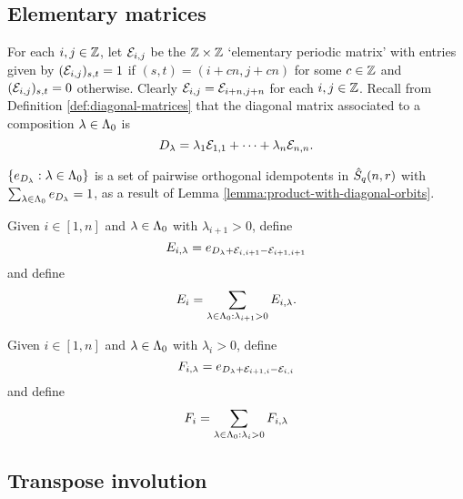 \documentclass[a4paper, 11pt]{report}
\begin{document}
\subsection{Elementary matrices}

For each $i,j\in\mathbb{Z}$, let $\mathcal{E}_{i,j}$ be the $\mathbb{Z}\times\mathbb{Z}$ `elementary periodic matrix' with entries given by $(\mathcal{E}_{i,j})_{s,t}=1$ if $(s,t) = (i+cn,j+cn)$ for some $c\in\mathbb{Z}$ and $(\mathcal{E}_{i,j})_{s,t}=0$ otherwise. Clearly $\mathcal{E}_{i,j} = \mathcal{E}_{i+n,j+n}$ for each $i,j\in\mathbb{Z}$. Recall from Definition \ref{def:diagonal-matrices} that the diagonal matrix associated to a composition $\lambda\in{\Lambda_0}$ is
\begin{equation*}
D_\lambda = \lambda_1\mathcal{E}_{1,1} +\cdots + \lambda_n\mathcal{E}_{n,n}.
\end{equation*}

$\{e_{D_\lambda}:\lambda\in{\Lambda_0}\}$ is a set of pairwise orthogonal idempotents in $\hat{S}_q(n,r)$ with $\sum_{\lambda\in{\Lambda_0}}e_{D_\lambda} = 1$, as a result of Lemma \ref{lemma:product-with-diagonal-orbits}.

Given $i\in[1,n]$ and $\lambda\in{\Lambda_0}$ with $\lambda_{i+1}>0$, define
\begin{equation*}
E_{i,\lambda} = e_{D_\lambda + \mathcal{E}_{i,i+1} - \mathcal{E}_{i+1,i+1}}
\end{equation*}
and define
\begin{equation*}
E_i = \sum_{\lambda\in{\Lambda_0}:\lambda_{i+1}>0} E_{i,\lambda}.
\end{equation*}

Given $i\in[1,n]$ and $\lambda\in{\Lambda_0}$ with $\lambda_i>0$, define
\begin{equation*}
F_{i,\lambda} = e_{D_\lambda + \mathcal{E}_{i+1,i} - \mathcal{E}_{i,i}}
\end{equation*}
and define
\begin{equation*}
F_i = \sum_{\lambda\in{\Lambda_0}:\lambda_i>0} F_{i,\lambda}
\end{equation*}

\subsection{Transpose involution}
\end{document}
